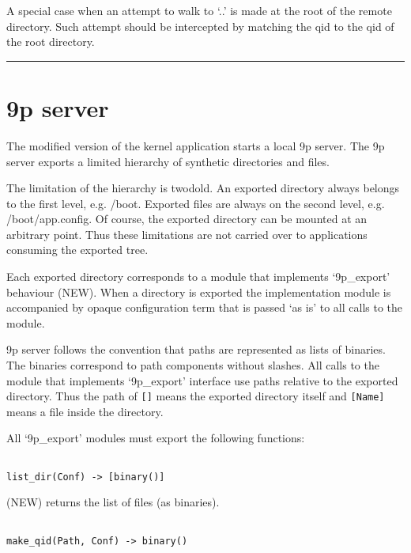 A special case when an attempt to walk to `..' is made at the root of the
remote directory. Such attempt should be intercepted by matching the qid to the
qid of the root directory.

\begin{center}\rule{3in}{0.4pt}\end{center}


\chapter{9p server}
\label{pserver}

The modified version of the kernel application starts a local 9p server. The
9p server exports a limited hierarchy of synthetic directories and files.

The limitation of the hierarchy is twodold. An exported directory always belongs
to the first level, e.g. \slash boot. Exported files are always on the second level,
e.g. \slash boot\slash app.config. Of course, the exported directory can be mounted at an
arbitrary point. Thus these limitations are not carried over to applications
consuming the exported tree.

Each exported directory corresponds to a module that implements `9p\_export'
behaviour (NEW). When a directory is exported the implementation module is
accompanied by opaque configuration term that is passed `as is' to all calls to
the module.

9p server follows the convention that paths are represented as lists of
binaries. The binaries correspond to path components without slashes. All calls
to the module that implements `9p\_export' interface use paths relative to the
exported directory. Thus the path of \texttt{[]} means the exported directory itself
and \texttt{[Name]} means a file inside the directory.

All `9p\_export' modules must export the following functions:

\begin{adjustwidth}{2.5em}{2.5em}
\begin{verbatim}

list_dir(Conf) -> [binary()]

\end{verbatim}
\end{adjustwidth}

(NEW) returns the list of files (as binaries).

\begin{adjustwidth}{2.5em}{2.5em}
\begin{verbatim}

make_qid(Path, Conf) -> binary()

\end{verbatim}
\end{adjustwidth}

